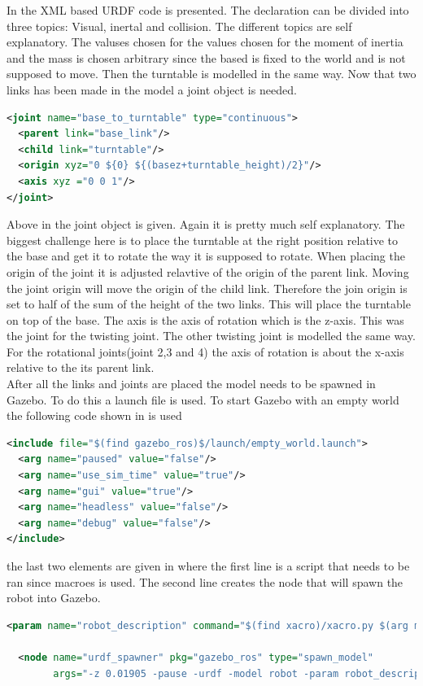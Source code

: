 In  the XML based URDF code is presented. The declaration can be divided into three topics: Visual, inertal and collision. The different topics are self explanatory. The valuses chosen for the values chosen for the moment of inertia and the mass is chosen arbitrary since the based is fixed to the world and is not supposed to move. Then the turntable is modelled in the same way. Now that two links has been made in the model a joint object is needed.

\begin{lstlisting}[language=xml,caption={joint between base and turntable},label={lst:jointBTT}]
<joint name="base_to_turntable" type="continuous">
  <parent link="base_link"/>
  <child link="turntable"/>
  <origin xyz="0 ${0} ${(basez+turntable_height)/2}"/>
  <axis xyz ="0 0 1"/>
</joint>
\end{lstlisting}
 Above in  the joint object is given. Again it is pretty much self explanatory. The biggest challenge here is to place the turntable at the right position relative to the base and get it to rotate the way it is supposed to rotate. When placing the origin of the joint it is adjusted relavtive of the origin of the parent link. Moving the joint origin will move the origin of the child link. Therefore the join origin is set to half of the sum of the height of the two links. This will place the turntable on top of the base. The axis is the axis of rotation which is the z-axis. This was the joint for the twisting joint. The other twisting joint is modelled the same way. For the rotational joints(joint 2,3 and 4) the axis of rotation is about the x-axis relative to the its parent link. \\
 
After all the links and joints are placed the model needs to be spawned in Gazebo. To do this a launch file is used. To start Gazebo with an empty world the following code shown in  is used
\begin{lstlisting}[language=xml,caption={Start Gazebo with empty world},label={lst:empty}]
<include file="$(find gazebo_ros)$/launch/empty_world.launch">
  <arg name="paused" value="false"/>
  <arg name="use_sim_time" value="true"/>
  <arg name="gui" value="true"/>
  <arg name="headless" value="false"/>
  <arg name="debug" value="false"/>
</include>
\end{lstlisting}
the last two elements are given in  where the first line is a script that needs to be ran since macroes is used. The second line creates the node that will spawn the robot into Gazebo. 
\begin{lstlisting}[caption={Spawn robot model in Gazebo},label={lst:l2},language=xml]
  <param name="robot_description" command="$(find xacro)/xacro.py $(arg model)" />

  <node name="urdf_spawner" pkg="gazebo_ros" type="spawn_model"
        args="-z 0.01905 -pause -urdf -model robot -param robot_description" respawn="false" output="screen" />
\end{lstlisting}